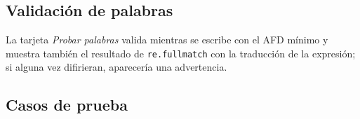 

\hypertarget{validaciuxf3n-de-palabras}{%
\subsection{Validación de palabras}\label{validaciuxf3n-de-palabras}}

La tarjeta \emph{Probar palabras} valida mientras se escribe con el AFD mínimo y muestra también el resultado de \texttt{re.fullmatch} con la traducción de la expresión; si alguna vez difirieran, aparecería una advertencia.

\hypertarget{casos-de-prueba}{%
\subsection{Casos de prueba}\label{casos-de-prueba}}

